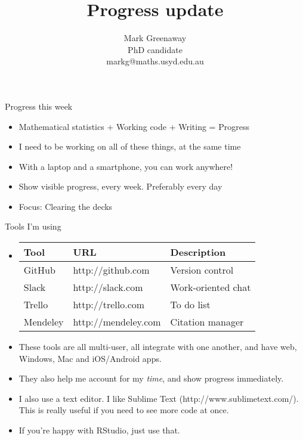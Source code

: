 \documentclass{beamer}
\title{Progress update}
\author{Mark Greenaway\\PhD candidate\\markg@maths.usyd.edu.au}
\begin{document}
\begin{frame}
\titlepage
\end{frame}

\begin{frame}{Progress this week}
\begin{itemize}
\item Mathematical statistics + Working code + Writing = Progress
\item I need to be working on all of these things, at the same time
\item With a laptop and a smartphone, you can work anywhere!
\item Show visible progress, every week. Preferably every day
\item Focus: Clearing the decks
\end{itemize}
\end{frame}

\begin{frame}{Tools I'm using}
\begin{itemize}
\item \begin{tabular}{|l|ll|}
\hline
Tool & URL & Description \\
\hline
GitHub & http://github.com & Version control \\
Slack & http://slack.com & Work-oriented chat \\
Trello & http://trello.com & To do list\\
Mendeley & http://mendeley.com & Citation manager \\
\hline
\end{tabular}
\item These tools are all multi-user, all integrate with one another, and have web, Windows, Mac and
			iOS/Android apps.
\item They also help me account for my \emph{time}, and show progress immediately.
\item I also use a text editor. I like Sublime Text (http://www.sublimetext.com/). This is really useful if
			you need to see more code at once.
\item If you're happy with RStudio, just use that.
\end{itemize}
\end{frame}
\end{document}
